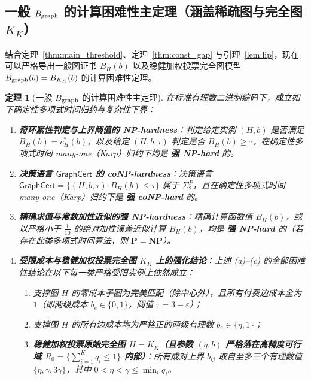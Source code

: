\documentclass[11pt,a4paper]{ctexart}
\newtheorem{theorem}{定理}[section]
\theoremstyle{definition}
\newcommand{\GraphCert}{\mathsf{GraphCert}}
\newcommand{\1}{\boldsymbol 1}
\newcommand{\0}{\boldsymbol 0}
\newcommand{\bgraph}{B_{\rm graph}}
\begin{document}
\subsection{一般 $B_{\rm graph}$ 的计算困难性主定理（涵盖稀疏图与完全图 $K_K$）}
结合定理~\ref{thm:main_threshold}、定理~\ref{thm:const_gap} 与引理~\ref{lem:lip}，现在可以严格导出一般图证书 $B_H(b)$ 以及稳健加权投票完全图模型 $\bgraph(b)=B_{K_K}(b)$ 的计算困难性定理。

\begin{theorem}[一般 $B_{\rm graph}$ 的计算困难性主定理]\label{thm:main_hardness}
在标准有理数二进制编码下，成立如下确定性多项式时间归约与复杂性下界：
\begin{enumerate}[label=(\alph*)]
\item \textbf{奇环紧性判定与上界阈值的 NP-hardness}：判定给定实例 $(H,b)$ 是否满足 $B_H(b)=c_H^*(b)$，以及给定 $(H,b,\tau)$ 判定是否 $B_H(b)\ge \tau$，在确定性多项式时间 many-one（Karp）归约下均是 \textbf{强 NP-hard} 的。
\item \textbf{决策语言 $\GraphCert$ 的 coNP-hardness}：决策语言 $\GraphCert=\{(H,b,\tau):B_H(b)\le\tau\}$ 属于 $\Sigma_2^P$，且在确定性多项式时间 many-one（Karp）归约下是 \textbf{强 coNP-hard} 的。
\item \textbf{精确求值与常数加性近似的强 NP-hardness}：精确计算函数值 $B_H(b)$，或以严格小于 $\frac{1}{10}$ 的绝对加性误差近似计算 $B_H(b)$，均是 \textbf{强 NP-hard} 的（若存在此类多项式时间算法，则 $\mathbf{P}=\mathbf{NP}$）。
\item \textbf{受限成本与稳健加权投票完全图 $K_K$ 上的强化结论}：上述 (a)--(c) 的全部困难性结论在以下每一类严格受限实例上依然成立：
\begin{enumerate}[label=(d\arabic*)]
\item 支撑图 $H$ 的零成本子图为完美匹配（除中心外），且所有付费边成本全为 $1$（即两级成本 $b_e\in\{0,1\}$，阈值 $\tau=3-\varepsilon$）；
\item 支撑图 $H$ 的所有边成本均为严格正的两级有理数 $b_e\in\{\eta,1\}$；
\item \textbf{稳健加权投票原始完全图 $H=K_K$（且参数 $(q,b)$ 严格落在高精度可行域 $R_0=\{\sum_{i=1}^K q_i\le 1\}$ 内部）}：所有成对上界 $b_{ij}$ 取自至多三个有理数值 $\{\eta,\gamma,3\gamma\}$，其中 $0<\eta<\gamma\le\min_i q_i$。
\end{enumerate}
\end{enumerate}
\end{theorem}
\end{document}
